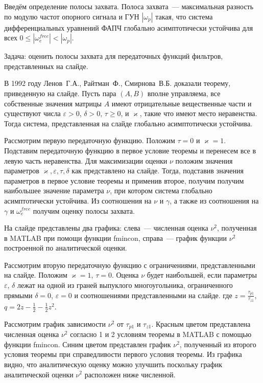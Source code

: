 \documentclass[a4paper,article,14pt]{extarticle}
\begin{document}
    Введём определение полосы захвата. Полоса захвата~--- максимальная разность по модулю частот опорного сигнала и ГУН $|\omega_p|$ такая, что система дифференциальных уравнений ФАПЧ глобально асимптотически устойчива для всех $0 \leqslant |\omega_e^{free}|<|\omega_p|$. 
    
Задача: оценить полосы захвата для передаточных функций фильтров, представленных на слайде.
    
В 1992 году Ленов~Г.\:А., Райтман~Ф., Смирнова~В.\:Б. доказали теорему, приведенную на слайде. Пусть пара $(A, B)$ вполне управляема, все собственные значения матрицы $A$ имеют отрицательные вещественные части и существуют числа $\varepsilon > 0$, $\delta > 0$, $\tau \geqslant 0$, и $\varkappa$, такие что имеют место неравенства. Тогда система, представленная на слайде глобально асимптотически устойчива.

Рассмотрим первую передаточную функцию. Положим $\tau = 0$ и $\varkappa = 1$. Подставим передаточную функцию в первое условие теоремы и перенесем все в левую часть неравенства. Для максимизации оценки $\nu$ положим значения параметров $\varkappa, \varepsilon, \tau, \delta$ как представлено на слайде. Тогда, подставив значения параметров в первое условие теоремы и применив второе, получим получим наибольшее значение параметра $\nu$, при котором система глобально асимптотически устойчива. Из соотношения на $\nu$ и $\gamma$, а также из соотношения на $\gamma$ и $\omega_e^{free}$ получим оценку полосы захвата.

На слайде представлены два графика: слева~--- численная оценка $\nu^2$, полученная в MATLAB при помощи функции fmincon, справа~--- график функции $\nu^2$ построенной по аналитической оценки.

Рассмотрим вторую передаточную функцию с ограничениями, представленными на слайде. Положим $\varkappa=1$, $\tau=0$. Оценка $\nu$ будет наибольшей, если параметры $\varepsilon$, $\delta$ лежат на одной из граней выпуклого многоугольника, ограниченного прямыми $\delta = 0$, $\varepsilon = 0$ и соотношениями представленными на слайде. где $z = \frac{\tau_{p1}}{\tau_{z1}}$, $q = 2z - \frac{1}{2} - \frac{1}{2}z^2$. 

Рассмотрим график зависимости $\nu^2$ от $\tau_{p1}$ и $\tau_{z1}$. Красным цветом представлена численная оценка $\nu^2$ согласно 1 и 2 условиям теоремы в MATLAB с помощью функции fmincon. Синим цветом представлен график $\nu^2$, полученный из второго условия теоремы при справедливости первого условия теоремы. Из графика видно, что аналитическую оценку можно улучшить поскольку график аналитической оценки $\nu^2$ расположен ниже численной.
\end{document}
